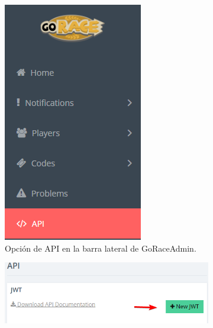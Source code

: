 \begin{figure}
    \begin{subfigure}{0.18\textwidth}
        \includegraphics[width=\linewidth]{images/go-admin-api.png}
        \caption{Opción de API en la barra lateral de GoRaceAdmin.}
        \label{fig:go-admin-api}
    \end{subfigure}
    \hspace*{\fill}
    \begin{subfigure}{0.28\textwidth}
        \includegraphics[width=\linewidth]{images/go-admin-add-jwt-btn.png}

\end{subfigure}
\end{figure}

